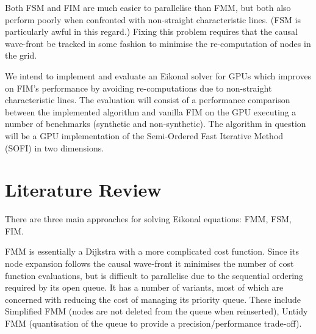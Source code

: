 \documentclass[11pt]{article}       %
\begin{document}
Both FSM and FIM are much easier to parallelise than FMM, but both also perform poorly when confronted with non-straight characteristic lines. (FSM is particularly awful in this regard.) Fixing this problem requires that the causal wave-front be tracked in some fashion to minimise the re-computation of nodes in the grid.

We intend to implement and evaluate an Eikonal solver for GPUs which improves on FIM's performance by avoiding re-computations due to non-straight characteristic lines. The evaluation will consist of a performance comparison between the implemented algorithm and vanilla FIM on the GPU executing a number of benchmarks (synthetic and non-synthetic). The algorithm in question will be a GPU implementation of the Semi-Ordered Fast Iterative Method (SOFI)\cite{gillberg2011semi} in two dimensions.




\section{Literature Review} \label{litrev}
\begin{comment}
Give an overview of the relevant literature. Cite all relevant
papers, like \cite{DEL07}, \cite{PD07}, \cite{DER07}, \cite{LDR07},
\cite{DLX06}, \cite{CDE06}, and \cite{DFL06}. Outline for each paper
the relevant results in relation to your project. Make sure that you
don't just list all relevant papers in random order. Devise a scheme
to group papers by subject. The goal is to present to the reader the
state-of-the-art in the field selected for your project.
\end{comment}

There are three main approaches for solving Eikonal equations: FMM, FSM, FIM.

FMM is essentially a Dijkstra with a more complicated cost function. Since its node expansion follows the causal wave-front it minimises the number of cost function evaluations, but is difficult to parallelise due to the sequential ordering required by its open queue. It has a number of variants, most of which are concerned with reducing the cost of managing its priority queue. These include Simplified FMM (nodes are not deleted from the queue when reinserted), Untidy FMM\cite{yatziv2006n} (quantisation of the queue to provide a precision/performance trade-off).
\end{document}
